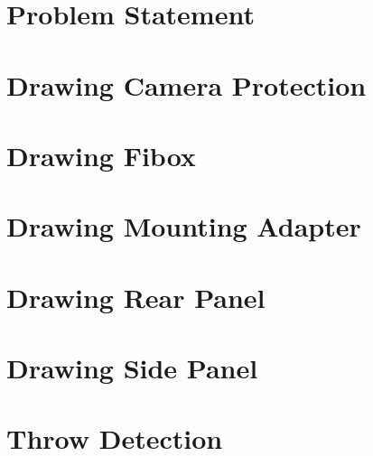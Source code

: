 \begin{appendix}
  \section{Problem Statement}
  \label{app:problem_statement}
  

  \section{Drawing Camera Protection}
  \label{app:drawings_camera_protection}
  

  \section{Drawing Fibox}
  \label{app:drawings_fibox_bottom}
  

  \section{Drawing Mounting Adapter}
  \label{app:drawings_mounting_adapter}
  

  \section{Drawing Rear Panel}
  \label{app:drawings_rear_panel}
  

  \section{Drawing Side Panel}
  \label{app:drawings_side_panel}
  

  \section{Throw Detection}
  \label{app:throw_detection}
  
\end{appendix}
